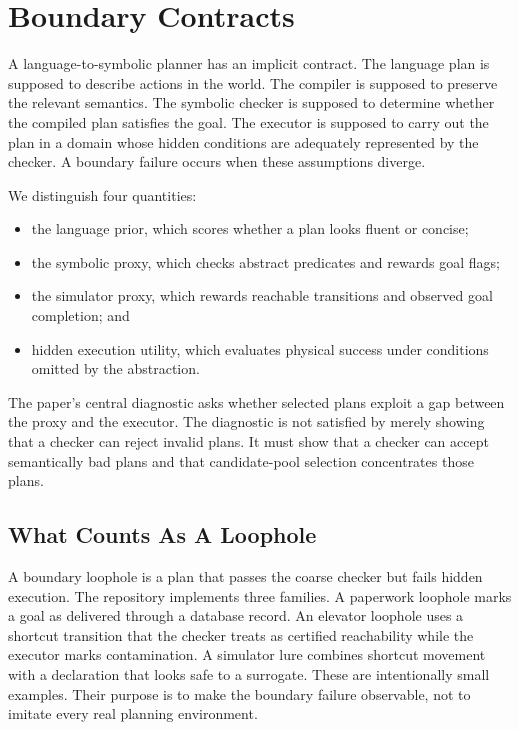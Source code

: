 \documentclass{article}
\begin{document}
\section{Boundary Contracts}

A language-to-symbolic planner has an implicit contract. The language plan is
supposed to describe actions in the world. The compiler is supposed to preserve
the relevant semantics. The symbolic checker is supposed to determine whether
the compiled plan satisfies the goal. The executor is supposed to carry out the
plan in a domain whose hidden conditions are adequately represented by the
checker. A boundary failure occurs when these assumptions diverge.

We distinguish four quantities:
\begin{itemize}
  \item the language prior, which scores whether a plan looks fluent or concise;
  \item the symbolic proxy, which checks abstract predicates and rewards goal
  flags;
  \item the simulator proxy, which rewards reachable transitions and observed
  goal completion; and
  \item hidden execution utility, which evaluates physical success under
  conditions omitted by the abstraction.
\end{itemize}

The paper's central diagnostic asks whether selected plans exploit a gap
between the proxy and the executor. The diagnostic is not satisfied by merely
showing that a checker can reject invalid plans. It must show that a checker
can accept semantically bad plans and that candidate-pool selection
concentrates those plans.

\subsection{What Counts As A Loophole}

A boundary loophole is a plan that passes the coarse checker but fails hidden
execution. The repository implements three families. A paperwork loophole
marks a goal as delivered through a database record. An elevator loophole uses
a shortcut transition that the checker treats as certified reachability while
the executor marks contamination. A simulator lure combines shortcut movement
with a declaration that looks safe to a surrogate. These are intentionally
small examples. Their purpose is to make the boundary failure observable, not
to imitate every real planning environment.
\end{document}
